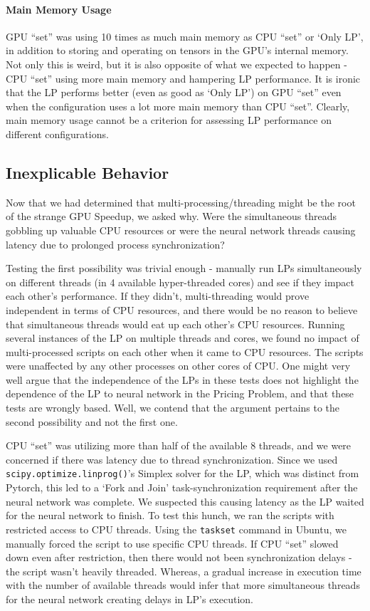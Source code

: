 \begin{appendices}
    \paragraph{Main Memory Usage} GPU ``set'' was using 10 times as much main memory as CPU ``set'' or `Only LP', in addition to storing and operating on tensors in the GPU's internal memory. Not only this is weird, but it is also opposite of what we expected to happen - CPU ``set'' using more main memory and hampering LP performance. It is ironic that the LP performs better (even as good as `Only LP') on GPU ``set'' even when the configuration uses a lot more main memory than CPU ``set''. Clearly, main memory usage cannot be a criterion for assessing LP performance on different configurations.
    
    \subsection{Inexplicable Behavior} \label{app:Inexplicable Behavior}
    Now that we had determined that multi-processing/threading might be the root of the strange GPU Speedup, we asked why. Were the simultaneous threads gobbling up valuable CPU resources or were the neural network threads causing latency due to prolonged process synchronization?
    
    Testing the first possibility was trivial enough - manually run LPs simultaneously on different threads (in 4 available hyper-threaded cores) and see if they impact each other's performance. If they didn't, multi-threading would prove independent in terms of CPU resources, and there would be no reason to believe that simultaneous threads would eat up each other's CPU resources. Running several instances of the LP on multiple threads and cores, we found no impact of multi-processed scripts on each other when it came to CPU resources. The scripts were unaffected by any other processes on other cores of CPU. One might very well argue that the independence of the LPs in these tests does not highlight the dependence of the LP to neural network in the Pricing Problem, and that these tests are wrongly based. Well, we contend that the argument pertains to the second possibility and not the first one. 
    
    CPU ``set'' was utilizing more than half of the available 8 threads, and we were concerned if there was latency due to thread synchronization. Since we used \texttt{scipy.optimize.linprog()}'s Simplex solver for the LP, which was distinct from Pytorch, this led to a `Fork and Join' task-synchronization requirement after the neural network was complete. We suspected this causing latency as the LP waited for the neural network to finish. To test this hunch, we ran the scripts with restricted access to CPU threads. Using the \texttt{taskset} command in Ubuntu, we manually forced the script to use specific CPU threads. If CPU ``set'' slowed down even after restriction, then there would not been synchronization delays - the script wasn't heavily threaded. Whereas, a gradual increase in execution time with the number of available threads would infer that more simultaneous threads for the neural network creating delays in LP's execution.
    

\end{appendices}

